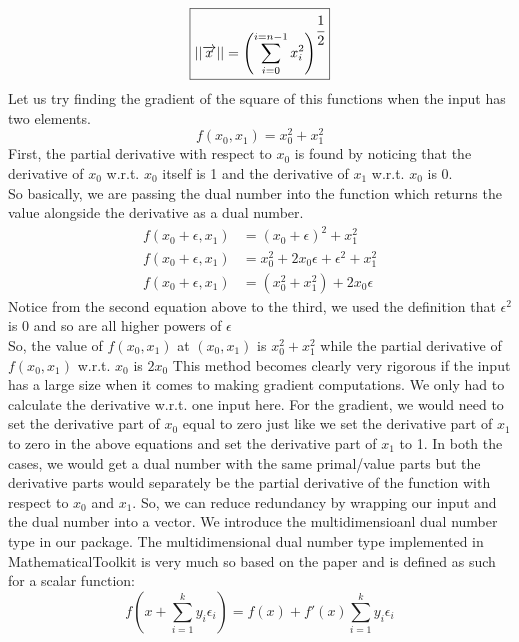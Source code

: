 \documentclass[12pt]{article}
\begin{document}
\begin{equation}
	\boxed{
	||\overrightarrow{x}|| = \left(\sum_{i=0}^{i=n-1}x_{i}^{2}\right)^{\cfrac{1}{2}}
}
	\label{l2norm}
\end{equation}
Let us try finding the gradient of the square of this functions when the input 
has two elements.
\begin{equation}
	\boxed{
f(x_{0},x_{1}) = x_{0}^{2} + x_{1}^{2}
}
\end{equation}
First, the partial derivative with respect to $x_{0}$ is found 
by noticing that the derivative of $x_{0}$ w.r.t. $x_{0}$ itself is 
1 and the  derivative of $x_{1}$ w.r.t. $x_{0}$ is 0. \\
So basically, we are passing the dual number into the function which 
returns the value alongside the derivative as a dual number.
\begin{align}
	f(x_{0}+\epsilon, x_{1}) &= (x_{0}+\epsilon)^{2} + x_{1}^{2}  \\
	f(x_{0}+\epsilon, x_{1}) &= x_{0}^{2} + 2x_{0}\epsilon + \epsilon^{2} + x_{1}^{2} \\
	f(x_{0}+\epsilon, x_{1}) &= (x_{0}^{2}+x_{1}^{2})+ 2x_{0}\epsilon  
\end{align}
Notice from the second equation above to the third, we used the definition 
that $\epsilon^{2}$ is 0 and so are all higher powers of $\epsilon$
\\
So, the value of $f(x_{0}, x_{1})$ at $(x_{0},x_{1})$ is 
$x_{0}^{2}+x_{1}^{2}$ while the partial derivative of $f(x_{0},x_{1})$ w.r.t.
$x_{0}$ is $2x_{0}$
This method becomes clearly very rigorous if the input has a large size when 
it comes to making gradient computations.
We only had to calculate the derivative w.r.t. one input here. 
For the gradient, we would need to set the derivative part
of $x_{0}$ equal to zero just like we set the derivative part of $x_{1}$ to
zero in the above equations and set the derivative part of $x_{1}$ to 1.
In both the cases, we would get a dual number with the same primal/value
parts but the derivative parts would separately be the partial derivative of 
the function with respect to $x_{0}$ and $x_{1}$.
So, we can reduce redundancy by wrapping our input and the dual number 
into a vector. We introduce the multidimensioanl dual number type in our package.
The multidimensional dual number type implemented in MathematicalToolkit 
is very much so based on the paper \cite{RevelsLubinPapamarkou2016} and is 
defined as such for a scalar function:
\begin{equation}
	f(x+\sum_{i = 1}^{k}y_{i}\epsilon_{i}) = f(x) + f'(x)\sum_{i=1}^{k}y_{i}\epsilon_{i}
\end{equation}
\end{document}
